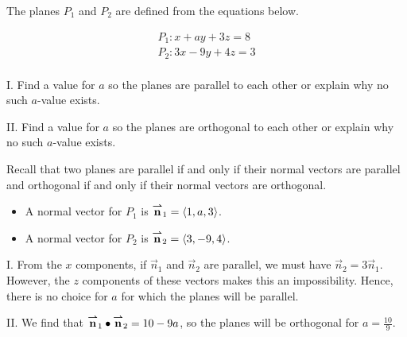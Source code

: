 \documentclass[noauthor]{ximera}
\begin{document}
\begin{problem}
The planes $P_1$ and $P_2$ are defined from the equations below.  

\begin{align*}
P_1 : x+ay+3z=8 \\
P_2 : 3x-9y+4z=3 \\
\end{align*}

I. Find a value for $a$ so the planes are parallel to each other or explain why no such $a$-value exists.

II. Find a value for $a$ so the planes are orthogonal to each other or explain why no such $a$-value exists.

\begin{freeResponse}
Recall that two planes are parallel if and only if their normal vectors are parallel and orthogonal if and only if their normal vectors are orthogonal.  

\begin{itemize}
\item A normal vector for $P_1$ is ${\overset{\boldsymbol{\rightharpoonup}}{\mathbf{n}}}_1 = \left\langle 1,a,3\right\rangle$.
\item A normal vector for $P_2$ is ${\overset{\boldsymbol{\rightharpoonup}}{\mathbf{n}}}_2 = \left\langle 3,-9,4\right\rangle$.
\end{itemize}

I. From the $x$ components, if $\vec{n}_1$ and $\vec{n}_2$ are parallel, we must have $\vec{n}_2 =3 \vec{n}_1$.  However, the $z$ components of these vectors makes this an impossibility.  Hence, there is no choice for $a$ for which the planes will be parallel.

II. We find that ${\overset{\boldsymbol{\rightharpoonup}}{\mathbf{n}}}_1 \bullet {\overset{\boldsymbol{\rightharpoonup}}{\mathbf{n}}}_2 = 10-9a$, so the planes will be orthogonal for $a=\frac{10}{9}$.
\end{freeResponse}
\end{problem}
\end{document}
